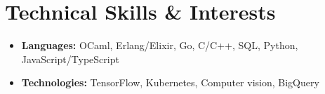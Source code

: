 \documentclass[letterpaper,11pt]{article}
\newcommand{\resumeItem}[1]{
  \item\small{#1 \vspace{-2pt}}
}
\newcommand{\resumeSubHeadingListStart}{\begin{itemize}[leftmargin=*]}
\newcommand{\resumeSubHeadingListEnd}{\end{itemize}}
\begin{document}
\section{Technical Skills \& Interests}
\resumeSubHeadingListStart{}
\resumeItem{
  \textbf{Languages:}{
    OCaml, Erlang/Elixir, Go, C/C++, SQL, Python, JavaScript/TypeScript
  }
}
\resumeItem{
  \textbf{Technologies:}{
    TensorFlow, Kubernetes, Computer vision, BigQuery
  }
}
\resumeSubHeadingListEnd{}
\end{document}
